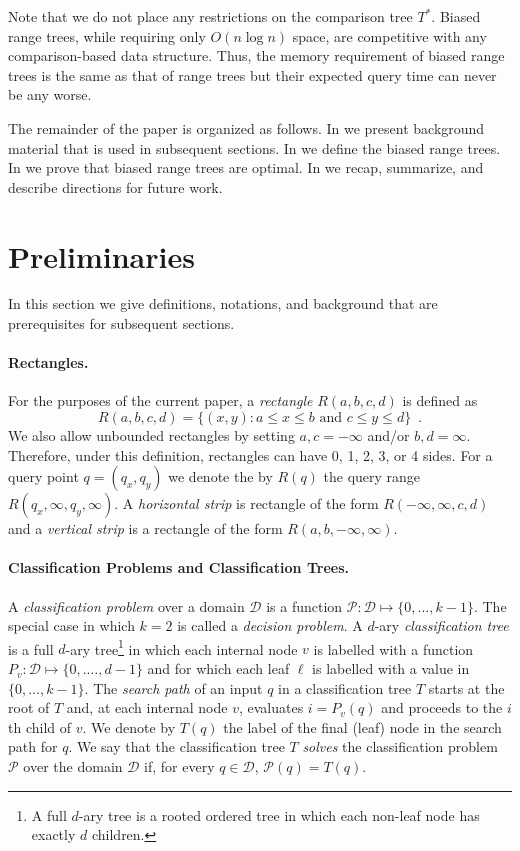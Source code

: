 \documentclass[lotsofwhite,charterfonts]{patmorin}
\begin{document}
Note that we do not place any restrictions on the comparison tree
$T^*$.  Biased range trees, while requiring only $O(n\log n)$ space,
are competitive with any comparison-based data structure.  Thus, the
memory requirement of biased range trees is the same as that of range
trees but their expected query time can never be any worse.
 
The remainder of the paper is organized as follows. In
 we present background material that is used in
subsequent sections.  In  we define the biased
range trees. In  we prove that biased range trees
are optimal.  In  we recap, summarize, and describe
directions for future work.

\section{Preliminaries}


In this section we give definitions, notations, and background
that are prerequisites for subsequent sections.

\paragraph{Rectangles.}

For the purposes of the current paper, a \emph{rectangle}
$R(a,b,c,d)$ is defined as
\[
    R(a,b,c,d) = \{ (x,y) : \mbox{$a\le  x \le b$ and $c \le y \le d$}\}
	\enspace .
\]
We also allow unbounded rectangles by setting $a,c=-\infty$ and/or
$b,d=\infty$.  Therefore, under this definition, rectangles can have
0, 1, 2, 3, or 4 sides.  For a query point $q=(q_x,q_y)$ we denote the
by $R(q)$ the query range $R(q_x,\infty,q_y,\infty)$.  A
\emph{horizontal strip} is rectangle of the form
$R(-\infty,\infty,c,d)$ and a \emph{vertical strip} is a rectangle of
the form $R(a,b,-\infty,\infty)$.

\paragraph{Classification Problems and Classification Trees.}

A \emph{classification problem} over a domain $\mathcal{D}$ is a
function $\mathcal{P}:\mathcal{D}\mapsto \{0,\ldots,k-1\}$.  The
special case in which $k=2$ is called a \emph{decision problem}.  A
$d$-ary \emph{classification tree} is a full $d$-ary tree\footnote{A
full $d$-ary tree is a rooted ordered tree in which each non-leaf node
has exactly $d$ children.} in which each internal node $v$ is labelled
with a function $P_v:\mathcal{D}\mapsto\{0,.\ldots,d-1\}$ and for
which each leaf $\ell$ is labelled with a value
in $\{0,\ldots,k-1\}$. The \emph{search path} of an input $q$
in a classification tree $T$ starts at the root of $T$ and, at each
internal node $v$, evaluates $i=P_v(q)$ and proceeds to the $i$th
child of $v$.  We denote by $T(q)$ the label of the final (leaf) node
in the search path for $q$.  We say that the classification tree $T$
\emph{solves} the classification problem $\mathcal{P}$ over the domain
$\mathcal{D}$ if, for every $q\in \mathcal{D}$, $\mathcal{P}(q)=T(q)$.
\end{document}
